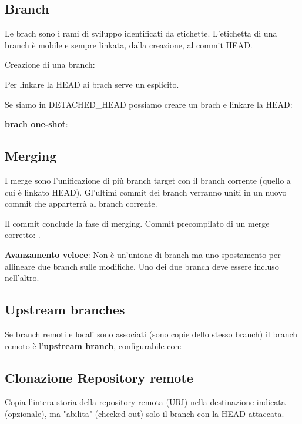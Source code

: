 \subsection{Branch}
Le brach sono i rami di sviluppo identificati da etichette.
L'etichetta di una branch è mobile e sempre linkata, dalla creazione, al commit HEAD.

Creazione di una branch:


Per linkare la HEAD ai brach serve un  esplicito.

\bigskip

Se siamo in DETACHED\_HEAD possiamo creare un brach e linkare la HEAD:

\textbf{brach one-shot}: 

\subsection{Merging}
I merge sono l'unificazione di più branch target con il branch corrente (quello a cui è linkato HEAD). Gl'ultimi commit dei branch verranno uniti in un nuovo commit che apparterrà al branch corrente.


Il commit conclude la fase di merging. Commit precompilato di un merge corretto: .

\textbf{Avanzamento veloce}: Non è un'unione di branch ma uno spostamento per allineare due branch sulle modifiche. Uno dei due branch deve essere incluso nell'altro.

\subsection{Upstream branches}
Se branch remoti e locali sono associati (sono copie dello stesso branch) il branch remoto è l'\textbf{upstream branch}, configurabile con:


\subsection{Clonazione Repository remote}
Copia l'intera storia della repository remota (URI) nella destinazione indicata (opzionale), ma "abilita" (checked out) solo il branch con la HEAD attaccata.

